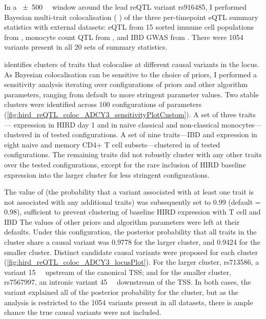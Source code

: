In a \SI{\pm 500}{\mega\bp} window around the lead \gls{reQTL} variant rs916485,
I performed Bayesian multi-trait colocalisation ( \autocite{foley2019FastEfficientColocalization}) of
the three per-timepoint  \gls{eQTL} summary statistics with external datasets:
 \gls{eQTL} from 15 sorted immune cell populations from \textcite{schmiedel2018ImpactGeneticPolymorphisms},
monocyte count \gls{QTL} from \textcite{astle2016AllelicLandscapeHuman},
and \gls{IBD} \gls{GWAS} from \textcite{delange2017GenomewideAssociationStudy}.
There were 1054 variants present in all 20 sets of summary statistics.

 identifies clusters of traits that colocalise at different causal variants in the locus.
As Bayesian colocalisation can be sensitive to the choice of priors,
I performed a sensitivity analysis iterating over configurations of priors and other algorithm parameters, ranging from default to more stringent parameter values.
Two stable clusters were identified across 100 configurations of parameters (\cref{fig:hird_reQTL_coloc_ADCY3_sensitivityPlotCustom}).
A set of three traits--- expression in \gls{HIRD} day 1 and in naive classical and non-classical monocytes---clustered in  of tested configurations.
A set of nine traits---\gls{IBD} and expression in eight naive and memory CD4+ T cell subsets---clustered in  of tested configurations.
The remaining traits did not robustly cluster with any other traits over the tested configurations,
except for the rare inclusion of \gls{HIRD} baseline  expression into the larger cluster for less stringent configurations.

%
%
%
%
The value of  (the probability that a variant associated with at least one trait is not associated with any additional traits) was subsequently set to 0.99 (default = 0.98), 
sufficient to prevent clustering of baseline \gls{HIRD} expression with T cell and \gls{IBD}
The values of other priors and algorithm parameters were left at their defaults.
Under this configuration, the posterior probability that all traits in the cluster share a causal variant was \num{0.9778} for the larger cluster, 
and \num{0.9424} for the smaller cluster.
Distinct candidate causal variants were proposed for each cluster (\cref{fig:hird_reQTL_coloc_ADCY3_locusPlot}).
For the larger cluster, rs713586, a variant \SI{15}{\kilo\bp} upstream of the canonical  \gls{TSS};
and for the smaller cluster, rs7567997, an intronic variant \SI{45}{\kilo\bp} downstream of the \gls{TSS}.
In both cases, the variant explained all of the posterior probability for the cluster, 
but as the analysis is restricted to the 1054 variants present in all datasets, there is ample chance the true causal variants were not included.

